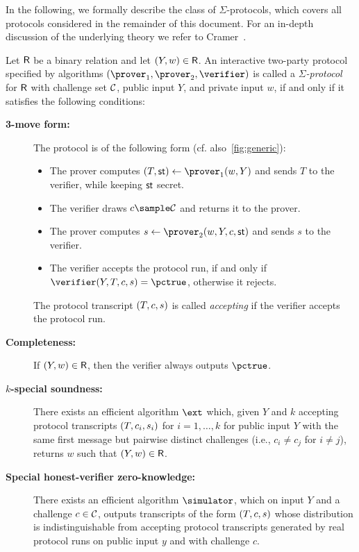 \documentclass[runningheads]{llncs}
\begin{document}
In the following, we formally describe the class of $\Sigma$-protocols, which covers all protocols considered in the remainder of this document.
 For an in-depth discussion of the underlying theory we refer to Cramer~\cite{cramer97}.
\begin{definition}\label{def:sigma}
  Let $\mathsf{R}$ be a binary relation and let $(Y,w)\in\mathsf{R}$.
  An interactive two-party protocol specified by algorithms $(\prover_1,\prover_2,\verifier)$ is called a \emph{$\Sigma$-protocol} for $\mathsf{R}$ with challenge set $\mathcal{C}$, public input $Y$, and private input $w$, if and only if it satisfies the following conditions:
  \begin{description}
    \item[\bf 3-move form:]
      The protocol is of the following form (cf. also~\cref{fig:generic}):
      \begin{itemize}
        \item
          The prover computes $(\commitment,\st) \gets \prover_1(\witness,\statement)$ and sends $T$ to the verifier, while keeping $\mathsf{st}$ secret.
        \item
          The verifier draws $c\sample\CS$ and returns it to the prover.
        \item
          The prover computes $s\gets\prover_2(\witness,\statement,\challenge,\st)$ and sends $s$ to the verifier.
        \item
          The verifier accepts the protocol run, if and only if $\verifier(Y, T,\challenge,s)=\accept$, otherwise it rejects.
      \end{itemize}
      The protocol transcript $(T,c,s)$ is called \emph{accepting} if the verifier accepts the protocol run.
    \item[\bf Completeness:]
      If $(Y,w)\in\mathsf{R}$, then the verifier always outputs $\accept$.
    \item[\bf $k$-special soundness:]
      There exists an efficient algorithm $\ext$ which, given $Y$ and $k$ accepting protocol transcripts $(T,c_i,s_i)$ for $i=1,\dots,k$ for public input $Y$ with the same first message but pairwise distinct challenges (i.e., $c_i\ne c_j$ for $i\ne j$), returns $w$ such that $(Y,w)\in\mathsf{R}$.
      \item[\bf Special honest-verifier zero-knowledge:]
      There exists an efficient algorithm $\simulator$, which on input $Y$ and a challenge $c\in\mathcal{C}$, outputs transcripts of the form $(T,c,s)$ whose distribution is indistinguishable from accepting protocol transcripts generated by real protocol runs on public input $y$ and with challenge $c$.

\end{description}
\end{definition}
\end{document}
